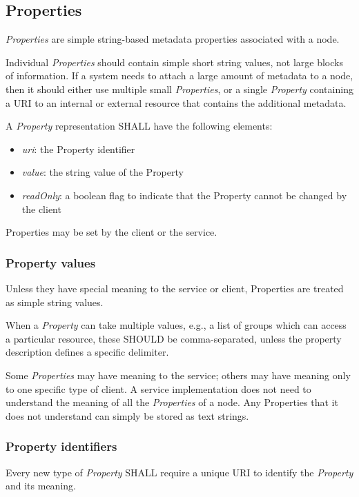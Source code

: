 \documentclass[11pt,a4paper]{ivoa}
\begin{document}
\subsection{Properties}
\label{subsec:properties}
\emph{Properties} are simple string-based metadata properties associated with a node.

Individual \emph{Properties} should contain simple short string values, not large blocks of information. If a system needs to attach a large amount of metadata to a node, then it should either use multiple small \emph{Properties}, or a single \emph{Property} containing a URI to an internal or external resource that contains the additional metadata.

A \emph{Property} representation SHALL have the following elements:

\begin{itemize}
    \item \emph{uri}: the Property identifier
    \item \emph{value}: the string value of the Property
    \item \emph{readOnly}: a boolean flag to indicate that the Property cannot be changed by the client
\end{itemize}

Properties may be set by the client or the service.

\subsubsection{Property values}
\label{subsubsec:property values}
Unless they have special meaning to the service or client, Properties are treated as simple string values.

When a \emph{Property} can take multiple values, e.g., a list of groups which can access a particular resource, these SHOULD be comma-separated, unless the property description defines a specific delimiter.

Some \emph{Properties} may have meaning to the service; others may have meaning only to one specific type of client. A service implementation does not need to understand the meaning of all the \emph{Properties} of a node. Any Properties that it does not understand can simply be stored as text strings.

\subsubsection{Property identifiers}
\label{subsubsec:property identifiers}
Every new type of \emph{Property} SHALL require a unique URI to identify the \emph{Property} and its meaning.
\end{document}
